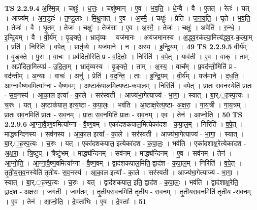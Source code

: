 \documentclass[17pt]{extarticle}
\begin{document}
                  \newline
                                \textbf{ TS 2.2.9.4} \newline
                  अ॒स्मि॒न्न् । चक्षुः॑ । ध॒त्तः॒ । चक्षु॑ष्मान् । ए॒व । भ॒व॒ति॒ । धे॒न्वै । वै । ए॒तत् । रेतः॑ । यत् । आज्य᳚म् । अ॒न॒डुहः॑ । त॒ण्डु॒लाः । मि॒थु॒नात् । ए॒व । अ॒स्मै॒ । चक्षुः॑ । प्रेति॑ । ज॒न॒य॒ति॒ । घृ॒ते । भ॒व॒ति॒ । तेजः॑ । वै । घृ॒तम् । तेजः॑ । चक्षुः॑ । तेज॑सा । ए॒व । अ॒स्मै॒ । तेजः॑ । चक्षुः॑ । अवेति॑ । रु॒न्धे॒ । इ॒न्द्रि॒यम् । वै । वी॒र्य᳚म् । वृ॒ङ्क्ते॒ । भ्रातृ॑व्यः । यज॑मानः । अय॑जमानस्य । अ॒द्ध्व॒रक॑ल्पा॒मित्य॑द्ध्व॒र-क॒ल्पा॒म् । प्रति॑ । निरिति॑ । व॒पे॒त् । भ्रातृ॑व्ये । यज॑माने । न । अ॒स्य॒ । इ॒न्द्रि॒यम् । \textbf{  49} \newline
                  \newline
                                \textbf{ TS 2.2.9.5} \newline
                  वी॒र्य᳚म् । वृ॒ङ्क्ते॒ । पु॒रा । वा॒चः । प्रव॑दितो॒रिति॒ प्र - व॒दि॒तोः॒ । निरिति॑ । व॒पे॒त् । याव॑ती । ए॒व । वाक् । ताम् । अप्रो॑दिता॒मित्यप्र॑ - उ॒दि॒ता॒म् । भ्रातृ॑व्यस्य । वृ॒ङ्क्ते॒ । ताम् । अ॒स्य॒ । वाच᳚म् । प्र॒वद॑न्ती॒मिति॑ प्र - वद॑न्तीम् । अ॒न्याः । वाचः॑ । अनु॑ । प्रेति॑ । व॒द॒न्ति॒ । ताः । इ॒न्द्रि॒यम् । वी॒र्य᳚म् । यज॑माने । द॒ध॒ति॒ । आ॒ग्ना॒वै॒ष्ण॒वमित्या᳚ग्ना - वै॒ष्ण॒वम् । अ॒ष्टाक॑पाल॒मित्य॒ष्टा-क॒पा॒ल॒म् । निरिति॑ । व॒पे॒त् । प्रा॒तः॒ स॒व॒नस्येति॑ प्रातः - स॒व॒नस्य॑ । आ॒का॒ल इत्या᳚ - का॒ले । सर॑स्वती । आज्य॑भा॒गेत्याज्य॑ - भा॒गा॒ । स्यात् । बा॒र्.॒ह॒स्प॒त्यः । च॒रुः । यत् । अ॒ष्टाक॑पाल॒ इत्य॒ष्टा - क॒पा॒लः॒ । भव॑ति । अ॒ष्टाक्ष॒रेत्य॒ष्टा- अ॒क्ष॒रा॒ । गा॒य॒त्री । गा॒य॒त्रम् । प्रा॒तः॒ स॒व॒नमिति॑ प्रातः - स॒व॒नम् । प्रा॒तः॒ स॒व॒नमिति॑ प्रातः - स॒व॒नम् । ए॒व । तेन॑ । आ॒प्नो॒ति॒ । \textbf{  50} \newline
                  \newline
                                \textbf{ TS 2.2.9.6} \newline
                  आ॒ग्ना॒वै॒ष्ण॒वमित्या᳚ग्ना - वै॒ष्ण॒वम् । एका॑दशकपाल॒मित्येका॑दश - क॒पा॒ल॒म् । निरिति॑ । व॒पे॒त् । माद्ध्य॑न्दिनस्य । सव॑नस्य । आ॒का॒ल इत्या᳚ - का॒ले । सर॑स्वती । आज्य॑भा॒गेत्याज्य॑ - भा॒गा॒ । स्यात् । बा॒र्.॒ह॒स्प॒त्यः । च॒रुः । यत् । एका॑दशकपाल॒ इत्येका॑दश - क॒पा॒लः॒ । भव॑ति । एका॑दशाक्ष॒रेत्येका॑दश - अ॒क्ष॒रा॒ । त्रि॒ष्टुप् । त्रैष्टु॑भम् । माद्ध्य॑न्दिनम् । सव॑नम् । माद्ध्य॑न्दिनम् । ए॒व । सव॑नम् । तेन॑ । आ॒प्नो॒ति॒ । आ॒ग्ना॒वै॒ष्ण॒वमित्या᳚ग्ना - वै॒ष्ण॒वम् । द्वाद॑शकपाल॒मिति॒ द्वाद॑श - क॒पा॒ल॒म् । निरिति॑ । व॒पे॒त् । तृ॒ती॒य॒स॒व॒नस्येति॑ तृतीय- स॒व॒नस्य॑ । आ॒का॒ल इत्या᳚ - का॒ले । सर॑स्वती । आज्य॑भा॒गेत्याज्य॑ - भा॒गा॒ । स्यात् । बा॒र्.॒ह॒स्प॒त्यः । च॒रुः । यत् । द्वाद॑शकपाल॒ इति॒ द्वाद॑श - क॒पा॒लः॒ । भव॑ति । द्वाद॑शाक्ष॒रेति॒ द्वाद॑श - अ॒क्ष॒रा॒ । जग॑ती । जाग॑तम् । तृ॒ती॒य॒स॒व॒नमिति॑ तृतीय - स॒व॒नम् । तृ॒ती॒य॒स॒व॒नमिति॑ तृतीय -स॒व॒नम् । ए॒व । तेन॑ । आ॒प्नो॒ति॒ । दे॒वता॑भिः । ए॒व । दे॒॒वताः᳚ । \textbf{  51} \newline
\end{document}
